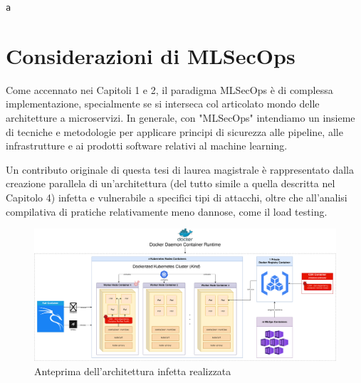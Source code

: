 % 
% 
% 

\begin{small}
\begin{Verbatim}[commandchars=\\\{\}]

\end{Verbatim}
\end{small}

{\small \verb|a|}


\clearpage
\cleardoublepage

\chapter{Considerazioni di MLSecOps}

Come accennato nei Capitoli 1 e 2, il paradigma MLSecOps è di complessa implementazione, specialmente se si interseca col articolato mondo delle architetture a microservizi. In generale, con "MLSecOps" intendiamo un insieme di tecniche e metodologie per applicare principi di sicurezza alle pipeline, alle infrastrutture e ai prodotti software relativi al machine learning.

Un contributo originale di questa tesi di laurea magistrale è rappresentato dalla creazione parallela di un'architettura (del tutto simile a quella descritta nel Capitolo 4) infetta e vulnerabile a specifici tipi di attacchi, oltre che all'analisi compilativa di pratiche relativamente meno dannose, come il load testing.

\begin{figure}[H]
    \centering
    \includegraphics[width=\linewidth]{figures/ch4and5/arch2.png}
    \caption[Anteprima dell'architettura infetta realizzata]{Anteprima dell'architettura infetta realizzata}
    \label{fig:cha6:arch}
\end{figure}

